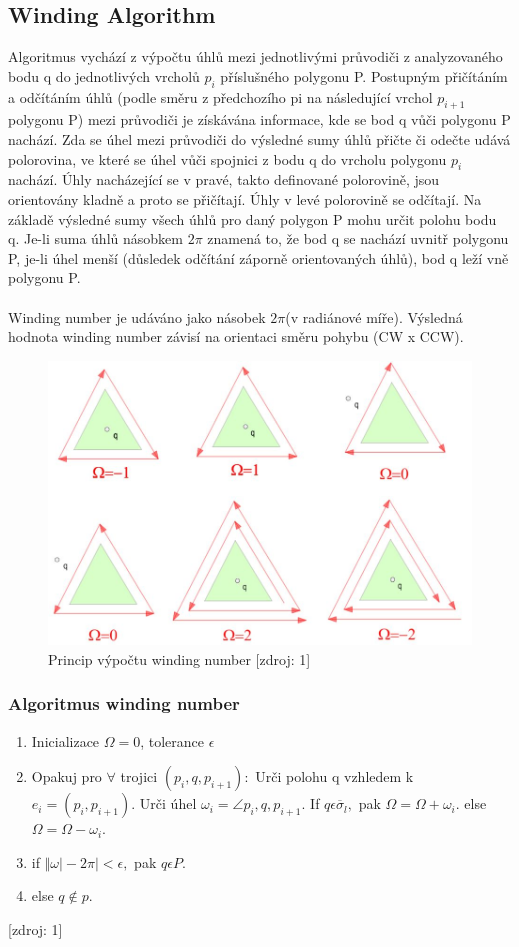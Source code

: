\documentclass[a4paper, 12pt]{article}
\begin{document}
\subsection{Winding Algorithm}
Algoritmus vychází z výpočtu úhlů mezi jednotlivými
průvodiči z analyzovaného bodu q do jednotlivých vrcholů $p_i$ příslušného polygonu P. Postupným přičítáním a odčítáním úhlů (podle směru z předchozího pi na následující vrchol $p_{i+1}$ polygonu P) mezi průvodiči je získávána informace, kde se bod q vůči polygonu P nachází. Zda se úhel mezi průvodiči do výsledné sumy úhlů přičte či
odečte udává polorovina, ve které se úhel vůči spojnici z bodu q do vrcholu polygonu $p_i$ nachází.
Úhly nacházející se v pravé, takto definované polorovině, jsou orientovány kladně a proto se
přičítají. Úhly v levé polorovině se odčítají. Na základě výsledné sumy všech úhlů pro daný polygon
P mohu určit polohu bodu q. Je-li suma úhlů násobkem $2\pi$ znamená to, že bod q se nachází uvnitř
polygonu P, je-li úhel menší (důsledek odčítání záporně orientovaných úhlů), bod q leží vně
polygonu P.\\
\\
Winding number je udáváno jako násobek $2\pi$(v radiánové míře). Výsledná hodnota winding
number závisí na orientaci směru pohybu (CW x CCW).

\begin{figure}[h!]
	\centering
	\includegraphics[width=12cm]{winding.jpg}
	\caption{Princip výpočtu winding number [zdroj: 1]}
\end{figure}

\subsubsection{Algoritmus winding number}
\begin{enumerate}
\item Inicializace $\Omega = 0$, tolerance $\epsilon$
\item Opakuj pro $ \forall $ trojici $ (p_i, q, p_{i+1}): $
\subitem Urči polohu q vzhledem k $e_i = (p_i, p_{i+1}).$
\subitem Urči úhel $ \omega_i = \angle p_i, q, p_{i+1}.$
\subitem If $ q \epsilon \overline{\sigma}_l, $ pak $ \Omega = \Omega + \omega_i. $
\subitem else $ \Omega = \Omega - \omega_i.$
\item if $ \Vert \omega \vert - 2\pi \vert < \epsilon, $ pak $ q \epsilon P. $
\item else $ q \notin p.$
\end{enumerate}[zdroj: 1]
\end{document}
